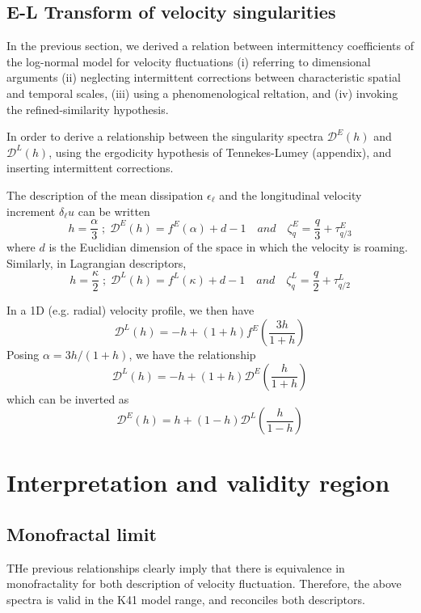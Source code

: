 \subsection{E-L Transform of velocity singularities}
In the previous section, we derived a relation between intermittency coefficients of the log-normal model for velocity fluctuations (i) referring to dimensional arguments (ii) neglecting intermittent corrections between characteristic spatial and temporal scales, (iii) using a phenomenological reltation, and (iv) invoking the refined-similarity hypothesis. 

In order to derive a relationship between the singularity spectra $\mathcal{D}^E(h)$ and $\mathcal{D}^L(h)$, using the ergodicity hypothesis of Tennekes-Lumey (appendix), and inserting intermittent corrections. 

The description of the mean dissipation $\epsilon_\ell$ and the longitudinal velocity increment $\delta_\ell u$ can be written
\begin{equation}
    h=\frac{\alpha}{3}\;;\;\mathcal{D}^E(h)=f^E(\alpha)+d-1\quad and\quad \zeta_q^E=\frac{q}{3}+\tau^E_{q/3}
\end{equation}
where $d$ is the Euclidian dimension of the space in which the velocity is roaming.
Similarly, in Lagrangian descriptors,
\begin{equation}
    h=\frac{\kappa}{2}\;;\;\mathcal{D}^L(h)=f^L(\kappa)+d-1\quad and\quad \zeta_q^L=\frac{q}{2}+\tau^L_{q/2}
\end{equation}

In a 1D (e.g. radial) velocity profile, we then have
\begin{equation}
    \mathcal{D}^L(h)=-h+(1+h)f^E\left(\frac{3h}{1+h}\right)
\end{equation}
Posing $\alpha=3h/(1+h)$, we have the relationship 
\begin{equation}
    \mathcal{D}^L(h)=-h+(1+h)\mathcal{D}^E\left(\frac{h}{1+h}\right)
\end{equation}
which can be inverted as 
\begin{equation}
    \mathcal{D}^E(h)=h+(1-h)\mathcal{D}^L\left(\frac{h}{1-h}\right)
\end{equation}

\section{Interpretation and validity region}
\subsection{Monofractal limit}
THe previous relationships clearly imply that there is equivalence in monofractality for both description of velocity fluctuation. Therefore, the above spectra is valid in the K41 model range, and reconciles both descriptors. 

